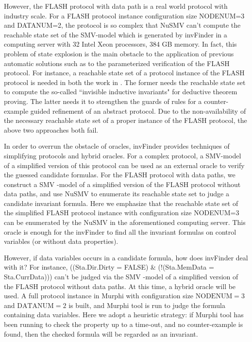 \documentclass{llncs}
\newcommand{\bedt}[1]{{\color{black}#1}}
\begin{document}
However, the FLASH protocol with data path is a real world protocol with industry scale. For a FLASH protocol   instance configuration size NODENUM=3 and DATANUM=2, the protocol is so complex that NuSMV can't compute the reachable state set of the SMV-model which is generated by {\sf invFinder} in a computing server  with 32 Intel Xeon processors, 384 GB memory. In fact, this problem of  state explosion is the main obstacle to the application of previous automatic solutions such as \cite{Arons2001,Lv2007} to the parameterized verification of the FLASH protocol. For instance, a reachable state set of a protocol instance of the FLASH protocol is needed in both the work in \cite{Arons2001,Lv2007}. The former needs the reachable state set to compute the so-called ``invisible inductive invariants" for deductive theorem proving. The latter needs it to strengthen
 the guards of rules for a counter-example guided refinement of an abstract protocol. Due to the non-availability of the necessary   reachable state set of a proper instance of the FLASH protocol, the above two approaches both fail.

 In order to overrun the obstacle of oracles, {\sf invFinder} provides techniques of simplifying protocols and hybrid oracles. For a complex protocol, a SMV-model of a  simplified version of this protocol can be used as an external oracle to verify the guessed candidate formulas. For the FLASH protocol with data paths,  we construct a SMV -model of a simplified version of the FLASH protocol without data paths, and use NuSMV to enumerate its reachable state set to judge a candidate invariant formula. Here we  emphasize that the reachable state set of the simplified FLASH protocol  instance  with configuration size NODENUM=3 can be enumerated by the NuSMV in the aforementioned computing server. This oracle is enough for the {\sf invFinder} to find all the invariant formulas on control variables (or without data properties).

 However, if  data variables occurs in a candidate formula, how does {\sf invFinder} deal with it?  For instance, ((Sta.Dir.Dirty = FALSE) \& (!(Sta.MemData = Sta.CurrData))) can't be judged via the SMV -model of a simplified version of the FLASH protocol without data paths. At this time, a hybrid oracle will be used.  A full protocol instance in Murphi  with configuration size $\mathrm{NODENUM}=3$ and $\mathrm{DATANUM}=2$ \bedt{is built}, and  Murphi \bedt{tool} is run to judge the formula containing data variables. Here we adopt a \bedt{heuristic} strategy: \bedt{if Murphi tool has been running to check the property up to a time-out,} and no counter-example is found, then the checked formula will be regarded as an invariant.
\end{document}
